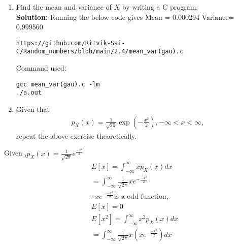 \documentclass[journal,12pt,twocolumn]{IEEEtran}
\renewcommand\thesection{\arabic{section}}
\providecommand{\brak}[1]{\ensuremath{\left(#1\right)}}
\theoremstyle{remark}
\newcommand{\solution}{\noindent \textbf{Solution: }}
\numberwithin{equation}{section}
\begin{document}
\begin{enumerate}[label=\thesection.\arabic*
,ref=\thesection.\theenumi]
What properties does the PDF have?
\\
\begin{figure}[h]
\centering
\texttt{[image: ./gauss\_pdf]}
\caption{The PDF of $X$}
\label{fig:gauss_pdf}
\end{figure}
\\
\solution The PDF of $X$ is plotted in \ref{fig:gauss_pdf} using the code below
\begin{lstlisting}
https://github.com/Ritvik-Sai-C/Random_numbers/blob/main/2.3/gauss_pdf.py
\end{lstlisting}
Use the below command to run the code:
\begin{lstlisting}
python3 pdf.py
\end{lstlisting}
Properties of PDF:
\begin{itemize}
\item PDF is symmetric about $x=0$\
\item graph is bell shaped\
\item mean of graph is situated at the apex point of the bell\
\end{itemize}
\item Find the mean and variance of $X$ by writing a C program.\\
\solution
Running the below code gives Mean = 0.000294 Variance= 0.999560
 \begin{lstlisting}
https://github.com/Ritvik-Sai-C/Random_numbers/blob/main/2.4/mean_var(gau).c
\end{lstlisting}
Command used:
\begin{lstlisting}
gcc mean_var(gau).c -lm
./a.out
\end{lstlisting}
\item Given that 
\begin{align}
p_{X}(x) = \frac{1}{\sqrt{2\pi}}\exp\brak{-\frac{x^2}{2}}, -\infty < x < \infty,
\end{align}
repeat the above exercise theoretically.
%
\end{enumerate}
Given ,$p_{X}(x)=\frac{1}{\sqrt{2\pi}} e^{\frac{-x^2}{2}}$\
\begin{align}
 &E[x]=\int_{-\infty}^{\infty} x p_{X}(x) dx\\
 &=\int_{-\infty}^{\infty} \frac{1}{\sqrt{2 \pi}} x e^{-\frac{-x^2}{2}}\\
  &\because x e^{-\frac{-x^2}{2}} \text{is a odd function},\\
  \nonumber
   &E[x]=0\\
 &E[x^2]=\int_{-\infty}^{\infty} x^2 p_{X}(x) dx\\
 &=\int_{-\infty}^{\infty} \frac{1}{\sqrt{2\pi}} x(xe^{-\frac{-x^2}{2}}) dx
\end{align}
\end{document}
